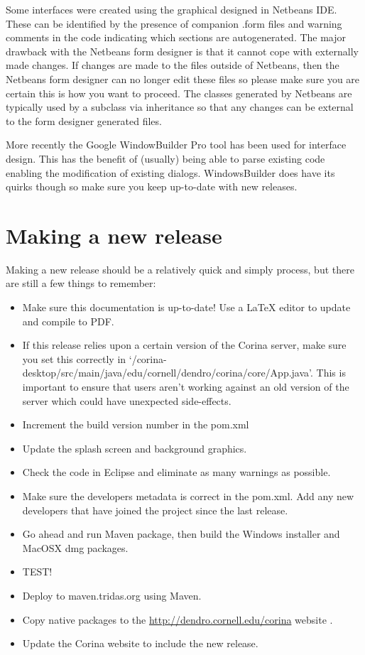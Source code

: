 Some interfaces were created using the graphical designed in Netbeans IDE.  These can be identified by the presence of companion .form files and warning comments in the code indicating which sections are autogenerated.  The major drawback with the Netbeans form designer is that it cannot cope with externally made changes.   If changes are made to the files outside of Netbeans, then the Netbeans form designer can no longer edit these files so please make sure you are certain this is how you want to proceed.  The classes generated by Netbeans are typically used by a subclass via inheritance so that any changes can be external to the form designer generated files. 

More recently the Google WindowBuilder Pro tool has been used for interface design.  This has the benefit of (usually) being able to parse existing code enabling the modification of existing dialogs.  WindowsBuilder does have its quirks though so make sure you keep up-to-date with new releases.

\section{Making a new release}
Making a new release should be a relatively quick and simply process, but there are still a few things to remember:

\begin{itemize}
 \item Make sure this documentation is up-to-date!  Use a {\LaTeX} editor to update and compile to PDF.
 \item If this release relies upon a certain version of the Corina server, make sure you set this correctly in `/corina-desktop/src/main/java/edu/cornell/dendro/corina/core/App.java'.  This is important to ensure that users aren't working against an old version of the server which could have unexpected side-effects.
 \item Increment the build version number in the pom.xml
 \item Update the splash screen and background graphics.
 \item Check the code in Eclipse and eliminate as many warnings as possible.
 \item Make sure the developers metadata is correct in the pom.xml.  Add any new developers that have joined the project since the last release.
 \item Go ahead and run Maven package, then build the Windows installer and MacOSX dmg packages.
 \item TEST!
 \item Deploy to maven.tridas.org using Maven.
 \item Copy native packages to the \url{http://dendro.cornell.edu/corina} website .
 \item Update the Corina website to include the new release.
\end{itemize}


